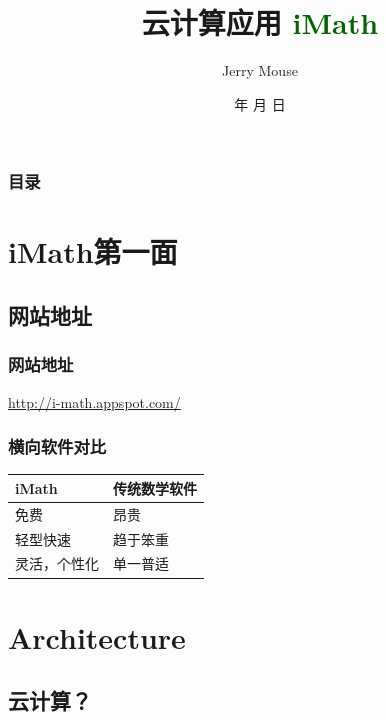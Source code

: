 \documentclass[dvipdfm,serif,mathserif]{beamer}
\renewcommand{\today}{\number\year 年 \number\month 月 \number\day 日}
\begin{document}
\title{  云计算应用   \textcolor{darkgreen}{\textbf{iMath}}}
\date{\today}
\author{Jerry Mouse}

\begin{frame}
\framesubtitle{}
  \titlepage
\end{frame}

\begin{frame}\frametitle{目录}
\tableofcontents

\end{frame}



\section{iMath第一面}
\subsection{网站地址}
\begin{frame}
  \frametitle{网站地址}
\begin{LARGE}\href{http://i-math.appspot.com/}{\color{blue}http://i-math.appspot.com/}
\end{LARGE}\end{frame}

\begin{frame}
  \frametitle{横向软件对比}
\begin{center}

\begin{tabular}{m{}m{}}
\hline
iMath & 传统数学软件 \\
\hline
免费   & 昂贵 \\
轻型快速   & 趋于笨重   \\
灵活，个性化    & 单一普适   \\
\hline
\end{tabular}

\end{center}
\end{frame}

\section{Architecture}
\subsection{云计算？}
\end{document}
